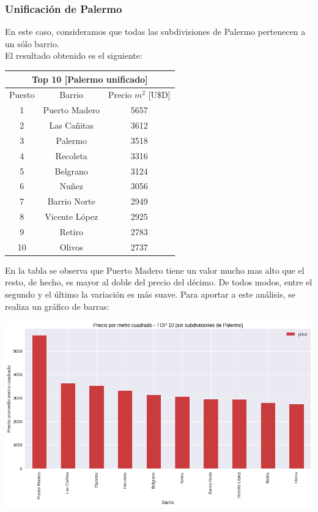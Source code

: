 \documentclass[a4paper, 10pt]{article}
\newcommand\tab[1][0.5cm]{\hspace*{#1}}
\begin{document}
				\subsubsection{Unificación de Palermo}
					En este caso, consideramos que todas las subdivisiones de Palermo pertenecen a un sólo barrio.\\
					\tab El resultado obtenido es el siguiente:
					\begin{center}
						\begin{tabular}{ |c|c|c| }
							\hline
							\multicolumn{3}{|c|}{Top 10 [Palermo unificado]}\\
							\hline
							\hline
							Puesto & Barrio & Precio $m^2$ [U$\$$D] \\
							\hline
							1 & Puerto Madero & 5657 \\
							2 & Las Cañitas & 3612 \\
							3 & Palermo & 3518 \\
							4 & Recoleta & 3316 \\
							5 & Belgrano & 3124 \\
							6 & Nuñez & 3056 \\
							7 & Barrio Norte & 2949 \\
							8 & Vicente López & 2925 \\
							9 & Retiro & 2783 \\
							10 & Olivos & 2737 \\
							\hline
						\end{tabular}
					\end{center}
					\tab En la tabla se observa que Puerto Madero tiene un valor mucho mas alto que el resto, de hecho, es
					mayor al doble del precio del décimo. De todos modos, entre el segundo y el último la variación es más
					suave. Para aportar a este análisis, se realiza un gráfico de barras:
					\begin{center}
   	    					\includegraphics[width=\textwidth]{images/m2UnifiedTop10}
			  		\end{center}	
\end{document}
